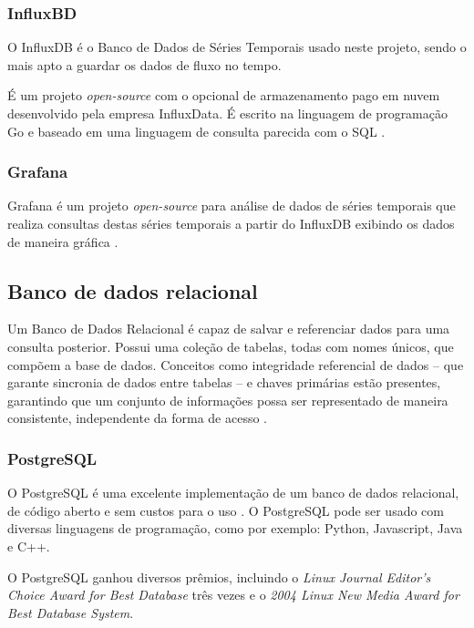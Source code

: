 \subsubsection{InfluxBD}

O InfluxDB é o Banco de Dados de Séries Temporais usado neste projeto, sendo o mais apto a guardar os dados de fluxo no tempo. \cite{Lundrigan2017}

É um projeto \textit{open-source} com o opcional de armazenamento pago em nuvem desenvolvido pela empresa InfluxData. É escrito na linguagem de programação Go e baseado em uma linguagem de consulta parecida com o SQL \cite{Noor2017}.

\subsubsection{Grafana}

Grafana é um projeto \textit{open-source} para análise de dados de séries temporais  \cite{Noor2017} que realiza consultas destas séries temporais a partir do InfluxDB exibindo os dados de maneira gráfica \cite{chang2017kubernetes}.

\subsection{Banco de dados relacional}

Um Banco de Dados Relacional é capaz de salvar e referenciar dados para uma consulta posterior. Possui uma coleção de tabelas, todas com nomes únicos, que compõem a base de
dados. Conceitos como integridade referencial de dados – que garante sincronia de dados entre tabelas – e chaves primárias estão presentes, garantindo que um conjunto de informações possa ser representado de maneira consistente, independente da forma de acesso  \cite{bancosrelacionais}.

\subsubsection{PostgreSQL}

O PostgreSQL é uma excelente implementação de um banco de dados relacional, de código aberto e sem custos para o uso  \cite{stones2006beginning}. O 
PostgreSQL pode ser usado com diversas linguagens de programação, como por exemplo: Python, Javascript, Java e C++.

O PostgreSQL ganhou diversos prêmios, incluindo o \textit{Linux Journal Editor's Choice Award for Best Database} três vezes e o \textit{2004 Linux New Media Award for Best Database System}.

